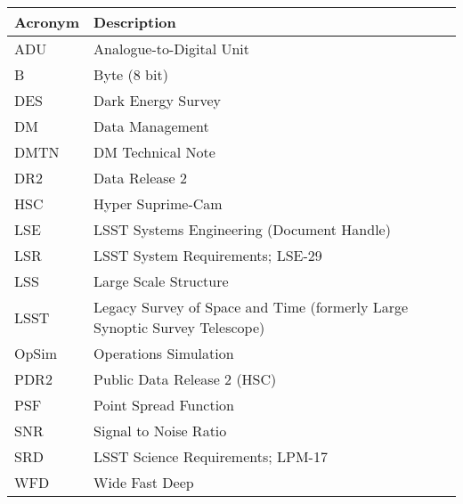 \addtocounter{table}{-1}
\begin{longtable}{p{}p{}}\hline
\textbf{Acronym} & \textbf{Description}  \\\hline

ADU & Analogue-to-Digital Unit \\\hline
B & Byte (8 bit) \\\hline
DES & Dark Energy Survey \\\hline
DM & Data Management \\\hline
DMTN & DM Technical Note \\\hline
DR2 & Data Release 2 \\\hline
HSC & Hyper Suprime-Cam \\\hline
LSE & LSST Systems Engineering (Document Handle) \\\hline
LSR & LSST System Requirements; LSE-29 \\\hline
LSS & Large Scale Structure \\\hline
LSST & Legacy Survey of Space and Time (formerly Large Synoptic Survey Telescope) \\\hline
OpSim & Operations Simulation \\\hline
PDR2 & Public Data Release 2 (HSC) \\\hline
PSF & Point Spread Function \\\hline
SNR & Signal to Noise Ratio \\\hline
SRD & LSST Science Requirements; LPM-17 \\\hline
WFD & Wide Fast Deep \\\hline
\end{longtable}
